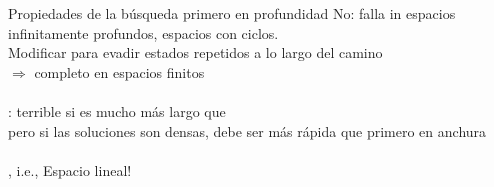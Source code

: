 \begin{frame}{Propiedades de la b\'usqueda primero en profundidad}
     No: falla in espacios infinitamente profundos, espacios con ciclos.\\
    \quad Modificar para evadir estados repetidos a lo largo del camino\\
    \quad $\Rightarrow$ completo en espacios finitos\\~\\
    
    : terrible si  es mucho m\'as largo que \\
    \quad pero si las soluciones son densas, debe ser m\'as r\'apida que primero en anchura\\~\\
    
    , i.e., Espacio lineal!\\

\end{frame}
